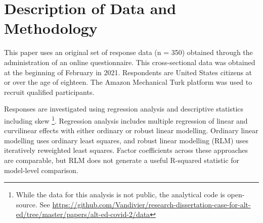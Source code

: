 \documentclass[review]{elsarticle}
\begin{document}

\section{Description of Data and Methodology}

This paper uses an original set of response data (n = 350) obtained through the administration of an online questionnaire.
This cross-sectional data was obtained at the beginning of February in 2021.
Respondents are United States citizens at or over the age of eighteen.
The Amazon Mechanical Turk platform was used to recruit qualified participants.

Responses are investigated using regression analysis and descriptive statistics including skew
\footnote{
    While the data for this analysis is not public, the analytical code is open-source.
    See \url{https://github.com/Vandivier/research-dissertation-case-for-alt-ed/tree/master/papers/alt-ed-covid-2/data}
}.
Regression analysis includes multiple regression of linear and curvilinear effects
with either ordinary or robust linear modelling.
Ordinary linear modelling uses ordinary least squares,
and robust linear modelling (RLM) uses iteratively reweighted least squares.
Factor coefficients across these approaches are comparable,
but RLM does not generate a useful R-squared statistic
for model-level comparison.
\end{document}
